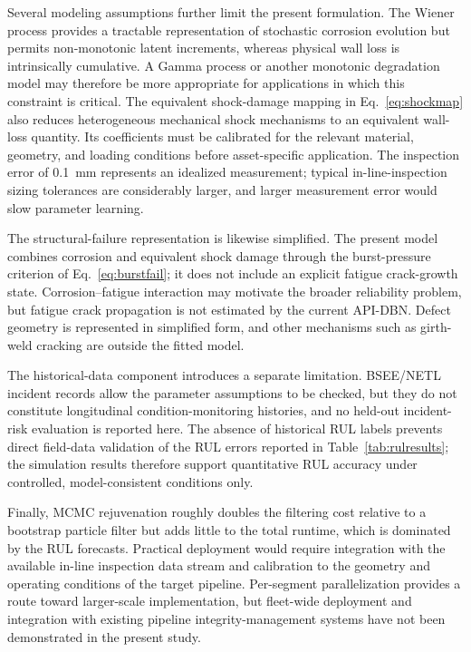 \documentclass[journal]{IEEEtran}
\begin{document}
Several modeling assumptions further limit the present formulation.
The Wiener process provides a tractable representation of stochastic
corrosion evolution but permits non-monotonic latent increments,
whereas physical wall loss is intrinsically cumulative. A Gamma
process or another monotonic degradation model may therefore be more
appropriate for applications in which this constraint is critical.
The equivalent shock-damage mapping in
Eq.~\eqref{eq:shockmap} also reduces heterogeneous mechanical shock
mechanisms to an equivalent wall-loss quantity. Its coefficients must
be calibrated for the relevant material, geometry, and loading
conditions before asset-specific application. The inspection error of
0.1~mm represents an idealized measurement; typical in-line-inspection
sizing tolerances are considerably larger, and larger measurement error
would slow parameter learning.

The structural-failure representation is likewise simplified. The
present model combines corrosion and equivalent shock damage through
the burst-pressure criterion of Eq.~\eqref{eq:burstfail}; it does not
include an explicit fatigue crack-growth state. Corrosion--fatigue
interaction may motivate the broader reliability problem, but fatigue
crack propagation is not estimated by the current API-DBN.
Defect geometry is represented in simplified form, and other
mechanisms such as girth-weld cracking are outside the fitted model.

The historical-data component introduces a separate limitation.
BSEE/NETL incident records allow the parameter assumptions to be
checked, but they do not constitute longitudinal
condition-monitoring histories, and no held-out incident-risk
evaluation is reported here. The absence of historical RUL labels
prevents direct field-data validation of the RUL errors reported in
Table~\ref{tab:rulresults}; the simulation results therefore support
quantitative RUL accuracy under controlled, model-consistent conditions
only.

Finally, MCMC rejuvenation roughly doubles the filtering cost relative
to a bootstrap particle filter but adds little to the total runtime,
which is dominated by the RUL forecasts. Practical deployment would
require integration with the available in-line inspection data stream
and calibration to the geometry and operating conditions of the target
pipeline. Per-segment parallelization provides a route toward
larger-scale implementation, but fleet-wide deployment and integration
with existing pipeline integrity-management systems have not been
demonstrated in the present study.
\end{document}
